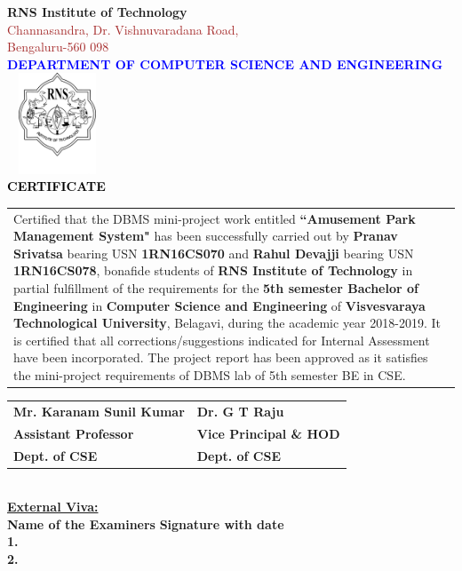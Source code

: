 \thispagestyle{empty}
\begin{center}
\break\break
\textup{\large {\textcolor{darkbrown}{\bf RNS Institute of Technology}} \\
{\normalsize{\textcolor{brown}{Channasandra, Dr. Vishnuvaradana Road,\\ Bengaluru-560 098}}}}\\[0.1in]
\textup{\normalsize {\textcolor{blue}{\bf DEPARTMENT OF COMPUTER SCIENCE AND ENGINEERING}}}\\[0.1in]
\includegraphics[width=3cm, height=3cm]{./RNS_logo.png}\\[0.1in]
\textup{\large {\textcolor{black}{\textbf {CERTIFICATE}}}} \\[0.1in]
\end{center}

\justify
\begin{tabular}{p{15cm}}
\hspace{0.4cm} Certified that the DBMS mini-project work entitled \textbf{``Amusement Park Management System"} has been successfully carried out by \textbf{Pranav Srivatsa} bearing USN \textbf{1RN16CS070} and \textbf{Rahul Devajji} bearing USN \textbf{1RN16CS078}, bonafide students of \textbf{RNS Institute of Technology } in partial fulfillment of the requirements for the \textbf{5th semester Bachelor of Engineering} in \textbf{Computer Science and Engineering} of \textbf{Visvesvaraya Technological University}, Belagavi, during the academic year 2018-2019. It is certified that all corrections/suggestions indicated for Internal Assessment have been incorporated. The project report has been approved as it satisfies the mini-project requirements of DBMS lab of 5th semester BE in CSE.\\[0.7in]
\end{tabular}

\justify
\begin{tabular}{l l}
\textbf{Mr. Karanam Sunil Kumar} & \hspace{1.7in}\textbf{Dr. G T Raju}\\
\textbf{Assistant Professor} & \hspace{1.7in}\textbf{Vice Principal \& HOD}\\
\textbf{Dept. of CSE} & \hspace{1.7in}\textbf{Dept. of CSE}\\[0.2in]
\end{tabular}
\\[0.3in]

\justify
\textup{\underline{\textbf{External Viva:}}} \\
\textup{\textbf{Name of the Examiners}}\hspace{6cm} {\textbf{Signature with date}} \\
\justify
\textup{\textbf{1.}} \\[0.4in]
\textup{\textbf{2.}}
\newpage
